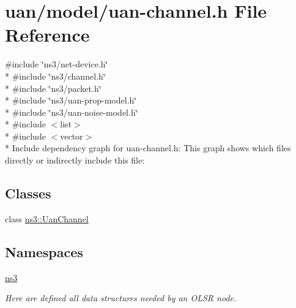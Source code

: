 \hypertarget{uan-channel_8h}{}\section{uan/model/uan-\/channel.h File Reference}
\label{uan-channel_8h}
{\ttfamily \#include \char`\"{}ns3/net-\/device.\+h\char`\"{}}\\*
{\ttfamily \#include \char`\"{}ns3/channel.\+h\char`\"{}}\\*
{\ttfamily \#include \char`\"{}ns3/packet.\+h\char`\"{}}\\*
{\ttfamily \#include \char`\"{}ns3/uan-\/prop-\/model.\+h\char`\"{}}\\*
{\ttfamily \#include \char`\"{}ns3/uan-\/noise-\/model.\+h\char`\"{}}\\*
{\ttfamily \#include $<$list$>$}\\*
{\ttfamily \#include $<$vector$>$}\\*
Include dependency graph for uan-\/channel.h\+:
This graph shows which files directly or indirectly include this file\+:
\subsection*{Classes}
\begin{DoxyCompactItemize}
\item 
class \hyperlink{classns3_1_1UanChannel}{ns3\+::\+Uan\+Channel}
\end{DoxyCompactItemize}
\subsection*{Namespaces}
\begin{DoxyCompactItemize}
\item 
 \hyperlink{namespacens3}{ns3}
\begin{DoxyCompactList}\small\item\em Here are defined all data structures needed by an O\+L\+SR node. \end{DoxyCompactList}\end{DoxyCompactItemize}
